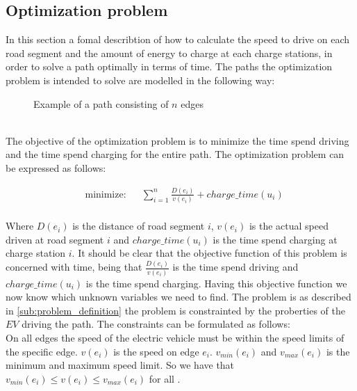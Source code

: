 \subsection{Optimization problem}
In this section a fomal describtion of how to calculate the speed to drive on each road segment and the amount of energy to charge at each charge stations, in order to solve a path optimally in terms of time. The paths the optimization problem is intended to solve are modelled in the following way: \\
\begin{figure}[h!]
\centering
    \caption{Example of a path consisting of $n$ edges} \label{fig:pathexample}
\end{figure} \\

The objective of the optimization problem is to minimize the time spend driving 
and the time spend charging for the entire path. The optimization problem can be expressed as follows:

\begin{equation}
	\begin{aligned} & 
	{\text{minimize:}}
	& & \sum_{i=1}^{n} \frac{D(e_i)}{v(e_i)} + charge\_time(u_i) \\
	\end{aligned}
\end{equation}\label{eq:objfunction}

Where $D(e_i)$ is the distance of road segment $i$, $v(e_i)$ is the actual speed driven at road segment $i$ and $charge\_time(u_i)$ is the time spend charging at charge station $i$. It should be clear that the objective function of this problem is concerned with time, being that $\frac{D(e_i)}{v(e_i)}$ is the time spend driving and $charge\_time(u_i)$ is the time spend charging. Having this objective function we now know which unknown variables we need to find. The problem is as described in \cref{sub:problem_definition} the problem is constrainted by the proberties of the $EV$ driving the path.  
The constraints can be formulated as follows: \\
On all edges the speed of the electric vehicle must be within the speed limits of the specific edge. $v(e_i)$ is the speed on edge $e_i$. $v_{min}(e_i)$ and $v_{max}(e_i)$ is the minimum and maximum speed limit. So we have that $v_{min}(e_i) \leq v(e_i) \leq v_{max}(e_i)$ for all .
 
